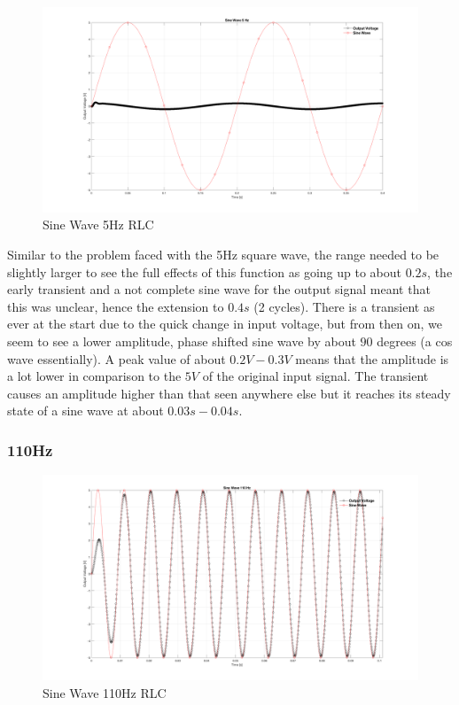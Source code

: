 \documentclass[a4paper, 12pt]{article}
\begin{document}
\begin{figure}[h]
\centering
\includegraphics[width=\textwidth]{ex3/Sine_Wave_5_Hz.png}
\caption{Sine Wave 5Hz RLC}
\end{figure}
 
Similar to the problem faced with the 5Hz square wave, the range needed to be slightly larger to see the full effects of this function as going up to about $0.2s$, the early transient and a not complete sine wave for the output signal meant that this was unclear, hence the extension to $0.4s$ (2 cycles). There is a transient as ever at the start due to the quick change in input voltage, but from then on, we seem to see a lower amplitude, phase shifted sine wave by about $90$ degrees (a cos wave essentially). A peak value of about $0.2V-0.3V$ means that the amplitude is a lot lower in comparison to the $5V$ of the original input signal. The transient causes an amplitude higher than that seen anywhere else but it reaches its steady state of a sine wave at about $0.03s-0.04s$.

\newpage
\subsubsection{110Hz}

\begin{figure}[h]
\centering
\includegraphics[width=\textwidth]{ex3/Sine_Wave_110_Hz.png}
\caption{Sine Wave 110Hz RLC}
\end{figure}
\end{document}
